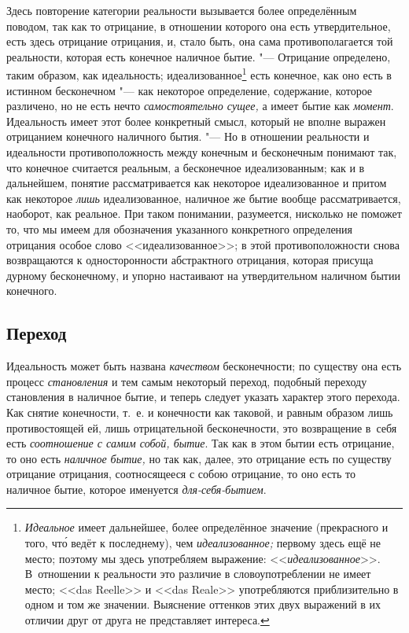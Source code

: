 Здесь повторение категории реальности вызывается более определённым поводом,
так как то отрицание, в отношении которого она есть утвердительное, есть
здесь отрицание отрицания, и, стало быть, она сама противополагается той
реальности, которая есть конечное наличное бытие. "--- Отрицание определено,
таким образом, как идеальность; идеализованное\footnote{{\em Идеальное}
имеет дальнейшее, более определённое значение (прекрасного и
того, чт\'{о} ведёт к последнему), чем {\em идеализованное;} первому здесь ещё
не место; поэтому мы здесь употребляем выражение: <<{\em идеализованное}>>.
В~отношении к реальности это различие в словоупотреблении не имеет место;
<<das Reelle>> и <<das Reale>> употребляются приблизительно в одном и том же
значении. Выяснение оттенков этих двух выражений в их отличии друг от друга
не представляет интереса.} есть конечное, как оно есть в истинном
бесконечном "--- как некоторое определение, содержание, которое различено, но
не есть нечто {\em самостоятельно сущее,} а имеет бытие
как {\em момент}. Идеальность имеет этот более
конкретный смысл, который не вполне выражен отрицанием конечного наличного
бытия. "--- Но в отношении реальности и идеальности противоположность между
конечным и бесконечным понимают так, что конечное считается реальным, а
бесконечное идеализованным; как и в дальнейшем, понятие рассматривается как
некоторое идеализованное и притом как некоторое
{\em лишь} идеализованное, наличное же бытие вообще
рассматривается, наоборот, как реальное. При таком понимании, разумеется,
нисколько не поможет то, что мы имеем для обозначения указанного
конкретного определения отрицания особое слово <<идеализованное>>; в этой
противоположности снова возвращаются к односторонности абстрактного
отрицания, которая присуща дурному бесконечному, и упорно настаивают на
утвердительном наличном бытии конечного.

\subsection[Переход]{Переход}

Идеальность может быть названа {\em качеством}
бесконечности; по существу она есть процесс
{\em становления} и тем самым некоторый переход,
подобный переходу становления в наличное бытие, и теперь следует указать
характер этого перехода. Как снятие конечности, т.~е. и конечности как
таковой, и равным образом лишь противостоящей ей, лишь отрицательной
бесконечности, это возвращение в~себя есть
{\em соотношение с самим собой, бытие}. Так как в этом бытии есть отрицание, то
оно есть {\em наличное бытие,} но так как, далее, это отрицание есть
по существу отрицание отрицания, соотносящееся с собою отрицание, то
оно есть то наличное бытие, которое именуется {\em для-себя-бытием}.

